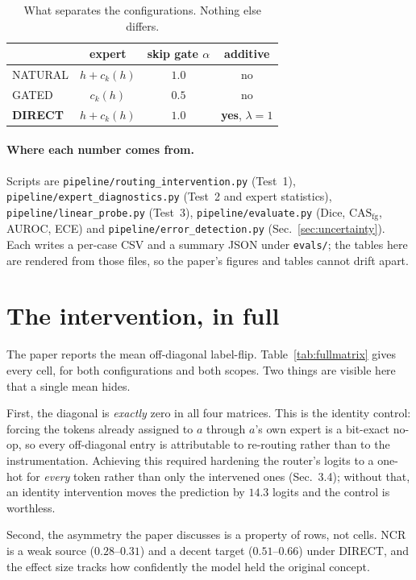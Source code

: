 \documentclass[10pt,twocolumn,letterpaper]{article}
\newcommand{\casfg}{\mathrm{CAS}_{\mathrm{fg}}}
\begin{document}
\begin{table}[t]\centering\footnotesize
\setlength{\tabcolsep}{3pt}
\caption{What separates the configurations. Nothing else differs.}
\label{tab:configs}
\begin{tabular}{lccc}
\toprule
& expert & skip gate $\alpha$ & additive \\
\midrule
NATURAL & $h+c_k(h)$ & $1.0$ & no \\
GATED   & $c_k(h)$   & $0.5$ & no \\
\textbf{DIRECT} & $h+c_k(h)$ & $1.0$ & \textbf{yes}, $\lambda{=}1$ \\
\bottomrule
\end{tabular}
\end{table}

\paragraph{Where each number comes from.}
Scripts are \texttt{pipeline/routing\_intervention.py} (Test~1),
\texttt{pipeline/expert\_diagnostics.py} (Test~2 and expert statistics),
\texttt{pipeline/linear\_probe.py} (Test~3), \texttt{pipeline/evaluate.py} (Dice,
$\casfg$, AUROC, ECE) and \texttt{pipeline/error\_detection.py} (Sec.~\ref{sec:uncertainty}).
Each writes a per-case CSV and a summary JSON under \texttt{evals/}; the tables here are
rendered from those files, so the paper's figures and tables cannot drift apart.

\section{The intervention, in full}
\label{sec:intervention}

The paper reports the mean off-diagonal label-flip. Table~\ref{tab:fullmatrix} gives every
cell, for both configurations and both scopes. Two things are visible here that a single
mean hides.

First, the diagonal is \emph{exactly} zero in all four matrices. This is the identity
control: forcing the tokens already assigned to $a$ through $a$'s own expert is a bit-exact
no-op, so every off-diagonal entry is attributable to re-routing rather than to the
instrumentation. Achieving this required hardening the router's logits to a one-hot for
\emph{every} token rather than only the intervened ones (Sec.~3.4); without that, an
identity intervention moves the prediction by $14.3$ logits and the control is worthless.

Second, the asymmetry the paper discusses is a property of rows, not cells. NCR is a weak
source ($0.28$--$0.31$) and a decent target ($0.51$--$0.66$) under DIRECT, and the effect
size tracks how confidently the model held the original concept.
\end{document}
